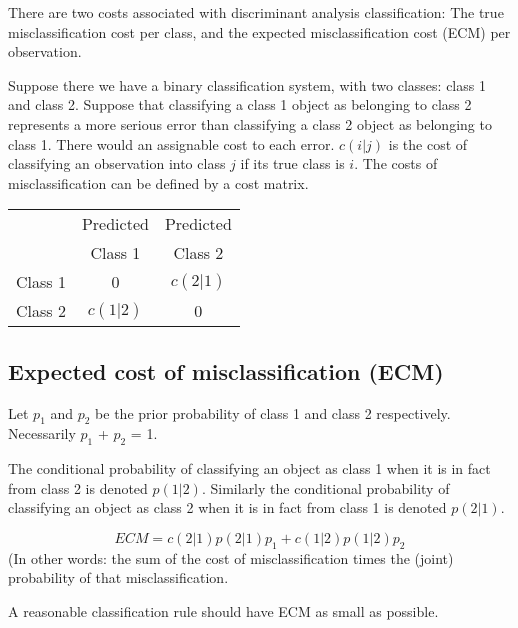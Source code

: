 \documentclass[12pt]{article}
\begin{document}
There are two costs associated with discriminant analysis classification: The true misclassification cost per class, and the expected misclassification cost (ECM) per observation.

Suppose there we have a binary classification system, with two classes: class 1 and class 2.
Suppose that classifying a class 1 object as belonging to class 2 represents a more serious error than classifying a class 2 object as belonging to class 1. There would an assignable cost to each error.
$c(i|j)$ is the cost of classifying an observation into class $j$ if its true class is $i$.
The costs of misclassification can be defined by a cost matrix.

\begin{tabular}{|c|c|c|}
  \hline
  & Predicted & Predicted \\
   & Class 1 & Class 2 \\  \hline
  Class 1 & 0 & $c(2|1)$  \\
  Class 2 & $c(1|2)$ & 0 \\
  \hline
\end{tabular}




\subsection{Expected cost of misclassification (ECM)}
Let $p_1$ and $p_2$ be the prior probability of class 1 and class 2 respectively.
Necessarily $p_1$ + $p_2$ = 1.

The conditional probability of classifying an object as class 1 when it is in fact from
class 2 is denoted $p(1|2)$.
Similarly the conditional probability of classifying an object as class 2 when it is in
fact from class 1 is denoted $p(2|1)$.

\[ECM = c(2|1)p(2|1)p_1 + c(1|2)p(1|2)p_2\]
(In other words: the sum of the cost of misclassification times the (joint) probability of that misclassification.

A reasonable classification rule should have ECM as small as possible.
\end{document}
